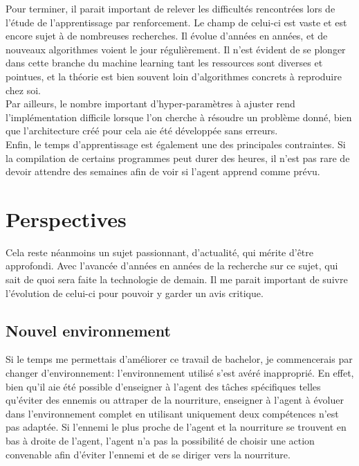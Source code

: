 \documentclass[11pt,a4paper]{report}
\begin{document}
  \par Pour terminer, il parait important de relever les difficultés rencontrées lors de l'étude de l'apprentissage par renforcement. Le champ de celui-ci est vaste et est encore sujet à de nombreuses recherches. Il évolue d'années en années, et de nouveaux algorithmes voient le jour régulièrement. Il n'est évident de se plonger dans cette branche du machine learning tant les ressources sont diverses et pointues, et la théorie est bien souvent loin d'algorithmes concrets à reproduire chez soi. \\
  Par ailleurs, le nombre important d'hyper-paramètres à ajuster rend l'implémentation difficile lorsque l'on cherche à résoudre un problème donné, bien que l'architecture créé pour cela aie été développée sans erreurs. \\
  Enfin, le temps d'apprentissage est également une des principales contraintes. Si la compilation de certains programmes peut durer des heures, il n'est pas rare de devoir attendre des semaines afin de voir si l'agent apprend comme prévu. 
  
  \section{Perspectives}
  
   \par Cela reste néanmoins un sujet passionnant, d'actualité, qui mérite d'être approfondi. Avec l'avancée d'années en années de la recherche sur ce sujet, qui sait de quoi sera faite la technologie de demain. Il me parait important de suivre l'évolution de celui-ci pour pouvoir y garder un avis critique. 

  \subsection{Nouvel environnement}  
  
  \par Si le temps me permettais d'améliorer ce travail de bachelor, je commencerais par changer d'environnement: l'environnement utilisé s'est avéré inapproprié. En effet, bien qu'il aie été possible d'enseigner à l'agent des tâches spécifiques telles qu'éviter des ennemis ou attraper de la nourriture, enseigner à l'agent à évoluer dans l'environnement complet en utilisant uniquement deux compétences n'est pas adaptée. Si l'ennemi le plus proche de l'agent et la nourriture se trouvent en bas à droite de l'agent, l'agent n'a pas la possibilité de choisir une action convenable afin d'éviter l'ennemi et de se diriger vers la nourriture. 
\end{document}
